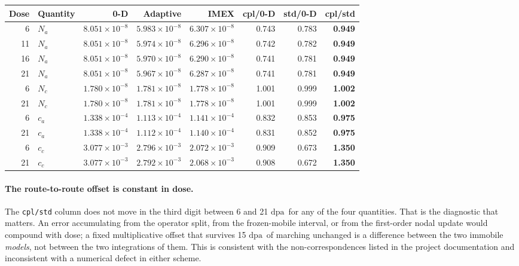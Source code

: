 \documentclass[11pt,a4paper]{article}
\newcommand{\code}[1]{\texttt{\small #1}}
\newcommand{\dpa}{\ensuremath{\mathrm{dpa}}}
\begin{document}
\begin{center}
\begin{tabular}{rlrrrrrr}
\toprule
Dose & Quantity & 0-D & Adaptive & IMEX & cpl/0-D & std/0-D & \textbf{cpl/std} \\
\midrule
 6 & $N_a$ & $8.051\times10^{-8}$ & $5.983\times10^{-8}$ & $6.307\times10^{-8}$ & 0.743 & 0.783 & \textbf{0.949} \\
11 & $N_a$ & $8.051\times10^{-8}$ & $5.974\times10^{-8}$ & $6.296\times10^{-8}$ & 0.742 & 0.782 & \textbf{0.949} \\
16 & $N_a$ & $8.051\times10^{-8}$ & $5.970\times10^{-8}$ & $6.290\times10^{-8}$ & 0.741 & 0.781 & \textbf{0.949} \\
21 & $N_a$ & $8.051\times10^{-8}$ & $5.967\times10^{-8}$ & $6.287\times10^{-8}$ & 0.741 & 0.781 & \textbf{0.949} \\
\midrule
 6 & $N_c$ & $1.780\times10^{-8}$ & $1.781\times10^{-8}$ & $1.778\times10^{-8}$ & 1.001 & 0.999 & \textbf{1.002} \\
21 & $N_c$ & $1.780\times10^{-8}$ & $1.781\times10^{-8}$ & $1.778\times10^{-8}$ & 1.001 & 0.999 & \textbf{1.002} \\
\midrule
 6 & $c_a$ & $1.338\times10^{-4}$ & $1.113\times10^{-4}$ & $1.141\times10^{-4}$ & 0.832 & 0.853 & \textbf{0.975} \\
21 & $c_a$ & $1.338\times10^{-4}$ & $1.112\times10^{-4}$ & $1.140\times10^{-4}$ & 0.831 & 0.852 & \textbf{0.975} \\
\midrule
 6 & $c_c$ & $3.077\times10^{-3}$ & $2.796\times10^{-3}$ & $2.072\times10^{-3}$ & 0.909 & 0.673 & \textbf{1.350} \\
21 & $c_c$ & $3.077\times10^{-3}$ & $2.792\times10^{-3}$ & $2.068\times10^{-3}$ & 0.908 & 0.672 & \textbf{1.350} \\
\bottomrule
\end{tabular}
\end{center}

\paragraph{The route-to-route offset is constant in dose.} The \code{cpl/std}
column does not move in the third digit between 6 and 21 \dpa\ for any of the
four quantities. That is the diagnostic that matters. An error accumulating
from the operator split, from the frozen-mobile interval, or from the
first-order nodal update would compound with dose; a fixed multiplicative
offset that survives 15 \dpa\ of marching unchanged is a difference between the
two immobile \emph{models}, not between the two integrations of them. This is
consistent with the non-correspondences listed in the project documentation and
inconsistent with a numerical defect in either scheme.
\end{document}
